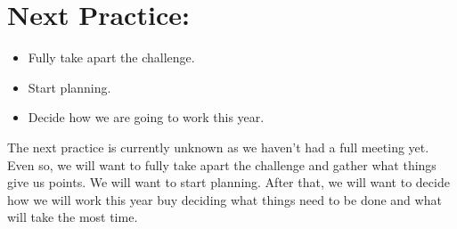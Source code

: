 \documentclass[12pt]{article}
\begin{document}
\section{Next Practice:}
\begin{itemize}
	\item Fully take apart the challenge. 
	\item Start planning. 
	\item Decide how we are going to work this year. 
\end{itemize}

The next practice is currently unknown as we haven't had a full meeting yet. Even so, we will want to fully take apart the challenge and gather what things give us points. We will want to start planning. After that, we will want to decide how we will work this year buy deciding what things need to be done and what will take the most time.
\end{document}
